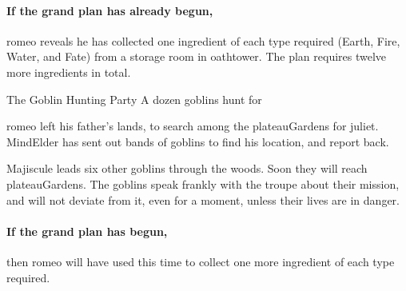 \paragraph{If the grand plan has already begun,}
\Gls{romeo} reveals he has collected one \gls{ingredient} of each type required (Earth, Fire, Water, and Fate) from a storage room in \gls{oathtower}.
The plan requires twelve more \glspl{ingredient} in total.

{The Goblin Hunting Party}%
{A dozen goblins hunt for }%

\Gls{romeo} left his father's lands, to search among the \gls{plateauGardens} for \gls{juliet}.
\Gls{MindElder} has sent out bands of goblins to find his location, and report back.

Majiscule leads six other goblins through the woods.
Soon they will reach \gls{plateauGardens}.
The goblins speak frankly with the troupe about their mission, and will not deviate from it, even for a moment, unless their lives are in danger.

\paragraph{If the grand plan has begun,}
then \gls{romeo} will have used this time to collect one more \gls{ingredient} of each type required.


